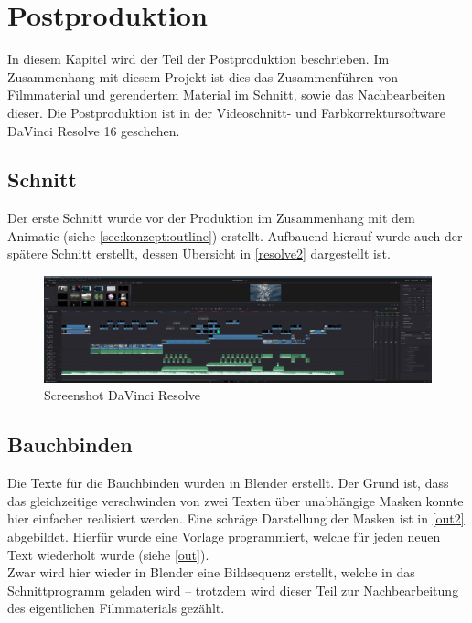 \chapter{Postproduktion}

In diesem Kapitel wird der Teil der Postproduktion beschrieben. Im Zusammenhang mit diesem Projekt ist dies das Zusammenführen von Filmmaterial und gerendertem Material im Schnitt, sowie das Nachbearbeiten dieser. Die Postproduktion ist in der Videoschnitt- und Farbkorrektursoftware DaVinci Resolve 16 geschehen.

\section{Schnitt}

Der erste Schnitt wurde vor der Produktion im Zusammenhang mit dem Animatic (siehe \autoref{sec:konzept:outline}) erstellt. Aufbauend hierauf wurde auch der spätere Schnitt erstellt, dessen Übersicht in \autoref{resolve2} dargestellt ist.

\begin{figure}[H]
\begin{center}
\includegraphics[width=\textwidth]{gfx/post/resolve2.jpg}
\caption{Screenshot DaVinci Resolve}
\label{resolve2}
\end{center}
\end{figure}

\section{Bauchbinden}
\label{sec:bauchbinden}

Die Texte für die Bauchbinden wurden in Blender erstellt. Der Grund ist, dass das gleichzeitige verschwinden von zwei Texten über unabhängige Masken konnte hier einfacher realisiert werden. Eine schräge Darstellung der Masken ist in \autoref{out2} abgebildet. Hierfür wurde eine Vorlage programmiert, welche für jeden neuen Text wiederholt wurde (siehe \autoref{out}).\\
Zwar wird hier wieder in Blender eine Bildsequenz erstellt, welche in das Schnittprogramm geladen wird -- trotzdem wird dieser Teil zur Nachbearbeitung des eigentlichen Filmmaterials gezählt.

